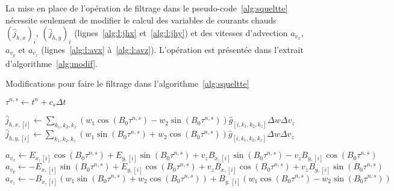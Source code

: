 La mise en place de l'opération de filtrage dans le pseudo-code~\ref{alg:squeltte} nécessite seulement de modifier le calcul des variables de courants chauds $\left(\hat{j}_{h,x}\right)_i$, $\left(\hat{j}_{h,y}\right)_i$ (lignes~\ref{alg:l:jhx} et~\ref{alg:l:jhy}) et des vitesses d'advection $a_{v_x}$, $a_{v_y}$ et $a_{v_z}$ (lignes~\ref{alg:l:avx} à~\ref{alg:l:avz}). L'opération est présentée dans l'extrait d'algorithme~\ref{alg:modif}.

\begin{algorithm}
  \caption{Modifications pour faire le filtrage dans l'algorithme~\ref{alg:squeltte}}
  \label{alg:modif}
  \begin{algorithmic}
    \State $\tau^{n,s} \gets t^n+c_s\Delta t$
  \end{algorithmic}
  \begin{algorithmic}[1]
    \State $\hat{j}_{h,x,[i]} \gets \sum_{k_1,k_2,k_z} ( w_1\cos(B_0\tau^{n,s}) - w_2\sin(B_0\tau^{n,s}) ) \hat{g}_{[i,k_1,k_2,k_z]} \Delta w\Delta v_z$
    \State $\hat{j}_{h,y,[i]} \gets \sum_{k_1,k_2,k_z} ( w_1\sin(B_0\tau^{n,s}) + w_2\cos(B_0\tau^{n,s}) ) \hat{g}_{[i,k_1,k_2,k_z]} \Delta w\Delta v_z$
  \end{algorithmic}
  \vspace{0.1cm}
  \begin{algorithmic}[1]
    \State $a_{v_x} \gets E_{x,[i]}\cos(B_0\tau^{n,s}) + E_{y,[i]}\sin(B_0\tau^{n,s}) + v_zB_{x,[i]}\sin(B_0\tau^{n,s}) - v_zB_{y,[i]}\cos(B_0\tau^{n,s})$
    \State $a_{v_y} \gets -E_{x,[i]}\sin(B_0\tau^{n,s}) + E_{y,[i]}\cos(B_0\tau^{n,s}) + v_zB_{x,[i]}\cos(B_0\tau^{n,s}) + v_zB_{y,[i]}\sin(B_0\tau^{n,s})$
    \State $a_{v_z} \gets -B_{x,[i]}(w_1\sin(B_0\tau^{n,s}) + w_2\cos(B_0\tau^{n,s})) + B_{y,[i]}(w_1\cos(B_0\tau^{n,s}) - w_2\sin(B_0\tau^{n,s}) )$
  \end{algorithmic}
\end{algorithm}
